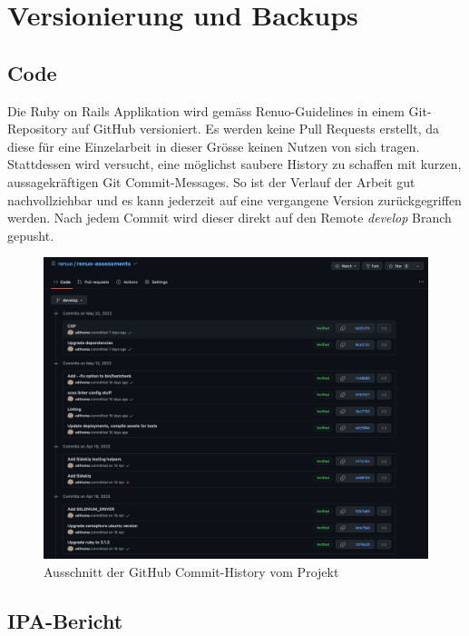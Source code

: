 \section{Versionierung und Backups} \label{sec:backups}

\subsection{Code}

Die Ruby on Rails Applikation wird gemäss Renuo-Guidelines in einem Git-Repository auf GitHub versioniert. Es werden keine Pull Requests erstellt,
da diese für eine Einzelarbeit in dieser Grösse keinen Nutzen von sich tragen. Stattdessen wird versucht, eine möglichst saubere History zu schaffen mit kurzen, aussagekräftigen Git Commit-Messages.
So ist der Verlauf der Arbeit gut nachvollziehbar und es kann jederzeit auf eine vergangene Version zurückgegriffen werden. Nach jedem Commit
wird dieser direkt auf den Remote \emph{develop} Branch gepusht.

\begin{figure}[H]
    \centering
    \includegraphics[width=14cm]{images/renuo-assessments-github.png}
    \caption{\label{fig:renuo-assessments-github}Ausschnitt der GitHub Commit-History vom Projekt}
\end{figure}

\newpage

\subsection{IPA-Bericht}

